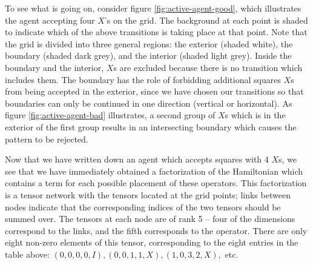 \documentclass[12pt]{amsbook}
\theoremstyle{plain}
\theoremstyle{definition}
\theoremstyle{remark}
\begin{document}
To see what is going on, consider figure \ref{fig:active-agent-good}, which illustrates the agent accepting four $X$'s on the grid.  The background at each point is shaded to indicate which of the above transitions is taking place at that point.  Note that the grid is divided into three general regions:  the exterior (shaded white), the boundary (shaded dark grey), and the interior (shaded light grey).  Inside the boundary and the interior, $X$s are excluded because there is no transition which includes them.  The boundary has the role of forbidding additional squares $X$s from being accepted in the exterior, since we have chosen our transitions so that boundaries can only be continued in one direction (vertical or horizontal).  As figure \ref{fig:active-agent-bad} illustrates, a second group of $X$s which is in the exterior of the first group results in an intersecting boundary which causes the pattern to be rejected.

Now that we have written down an agent which accepts squares with 4 $X$s, we see that we have immediately obtained a factorization of the Hamiltonian which contains a term for each possible placement of these operators.  This factorization is a tensor network with the tensors located at the grid points;  links between nodes indicate that the corresponding indices of the two tensors should be summed over.  The tensors at each node are of rank 5 -- four of the dimensions correspond to the links, and the fifth corresponds to the operator.  There are only eight non-zero elements of this tensor, corresponding to the eight entries in the table above: $(0,0,0,0,I), (0,0,1,1,X), (1,0,3,2,X),$ etc.

\end{document}
